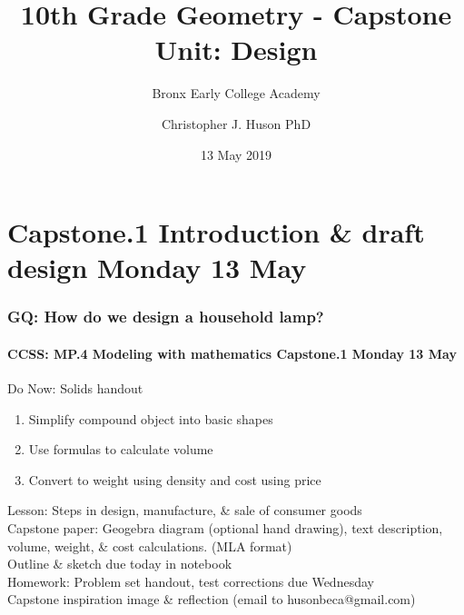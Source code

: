 \documentclass{beamer}
\title{10th Grade Geometry - Capstone Unit: Design}
\subtitle{Bronx Early College Academy}
\author{Christopher J. Huson PhD}
\date{13 May 2019}
\begin{document}
\frame{\titlepage}
\section[Outline]{}
\frame{\tableofcontents}


\section{Capstone.1 Introduction \& draft design Monday 13 May}
  \frame
  {
    \frametitle{GQ: How do we design a household lamp?}
    \framesubtitle{CCSS: MP.4 Modeling with mathematics \hfill \alert{Capstone.1 Monday 13 May}}

    \begin{block}{Do Now: Solids handout}
      \begin{enumerate}
        \item Simplify compound object into basic shapes
        \item Use formulas to calculate volume
        \item Convert to weight using density and cost using price
      \end{enumerate}
    \end{block}
    Lesson: Steps in design, manufacture, \& sale of consumer goods\\[0.25cm]
    Capstone paper: Geogebra diagram (optional hand drawing), text description, volume, weight, \& cost calculations. (MLA format)\\
    \alert{Outline \& sketch due today in notebook}\\[0.25cm]
    Homework: Problem set handout, test corrections due Wednesday\\
    Capstone inspiration image \& reflection (email to husonbeca@gmail.com)
  }
\end{document}
